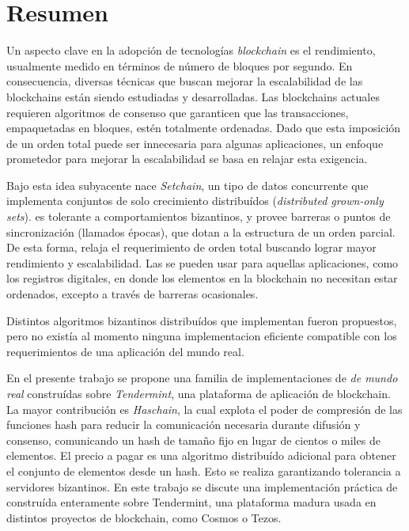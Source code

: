   \chapter*{Resumen}
  Un aspecto clave en la adopción de tecnologías \textit{blockchain} es el rendimiento,
  usualmente medido en términos de número de bloques por segundo.
  En consecuencia, diversas técnicas que buscan mejorar la escalabilidad de las blockchains
  están siendo estudiadas y desarrolladas.
  Las blockchains actuales requieren algoritmos de consenso que garanticen que las
  transacciones, empaquetadas en bloques, estén totalmente ordenadas.
  Dado que esta imposición de un orden total puede ser innecesaria para algunas aplicaciones,
  un enfoque prometedor para mejorar la escalabilidad se basa en relajar esta exigencia.

  Bajo esta idea subyacente nace \textit{Setchain}, un tipo de
  datos concurrente que implementa conjuntos de solo crecimiento distribuídos 
  (\textit{distributed grown-only sets}).
  \setchain
  es tolerante a comportamientos bizantinos, y provee barreras o puntos de sincronización
  (llamados épocas), que dotan a la estructura de un orden parcial.
  De esta forma, relaja el requerimiento de orden total buscando lograr mayor
  rendimiento y escalabilidad.
  Las \setchains se pueden usar para aquellas aplicaciones, como los registros digitales,
  en donde los elementos en la blockchain no necesitan estar ordenados, excepto a través
  de barreras ocasionales.
  
  
  Distintos algoritmos bizantinos distribuídos que implementan \setchain fueron
  propuestos, pero no existía al momento ninguna implementacion eficiente compatible con
  los requerimientos de una aplicación del mundo real.
  
  En el presente trabajo se propone una familia de implementaciones de \setchain 
  \textit{de mundo real} construídas sobre \textit{Tendermint}, una plataforma de
  aplicación de blockchain.  
  La mayor contribución es \textit{Haschain}, la cual explota el poder de compresión de las
  funciones hash para reducir la comunicación necesaria durante difusión y consenso,
  comunicando un hash de tamaño fijo en lugar de cientos o miles de elementos.
  El precio a pagar es una algoritmo distribuído adicional para obtener el conjunto de
  elementos desde un hash. Esto se realiza garantizando tolerancia a servidores bizantinos.
  En este trabajo se discute una implementación práctica de \hashchain construída enteramente
  sobre Tendermint, una plataforma madura usada en distintos proyectos de blockchain, como
  Cosmos o Tezos.

